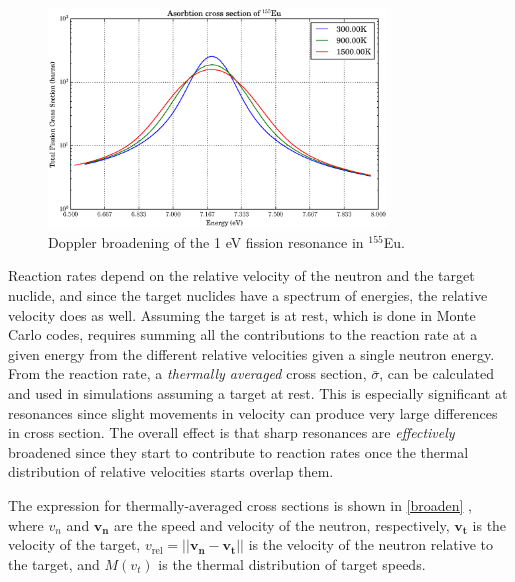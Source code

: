 \begin{figure}[h!]
  \centering
    \includegraphics[width=0.8\textwidth]{graphics/xs_eu_broaden.eps}
     \caption{Doppler broadening of the 1 eV fission resonance in  $^{155}$Eu.  \label{xs_eu_broaden}}
\end{figure}

Reaction rates depend on the relative velocity of the neutron and the target nuclide, and since the target nuclides have a spectrum of energies, the relative velocity does as well.  Assuming the target is at rest, which is done in Monte Carlo codes, requires summing all the contributions to the reaction rate at a given energy from the different relative velocities given a single neutron energy.  From the reaction rate, a \emph{thermally averaged} cross section, $\bar{\sigma}$, can be calculated and used in simulations assuming a target at rest.  This is especially significant at resonances since slight movements in velocity can produce very large differences in cross section.  The overall effect is that sharp resonances are \emph{effectively} broadened since they start to contribute to reaction rates once the thermal distribution of relative velocities starts overlap them.  
 
The expression for thermally-averaged cross sections is shown in \eqref{broaden} \cite{openmc}, where $v_n$ and $\boldsymbol{v_n}$ are the speed and velocity of the neutron, respectively, $\boldsymbol{v_t}$ is the velocity of the target, $v_\mathrm{rel} = || \boldsymbol{v_n} -\boldsymbol{v_t}||$ is the velocity of the neutron relative to the target, and $M(v_t)$ is the thermal distribution of target speeds.  

